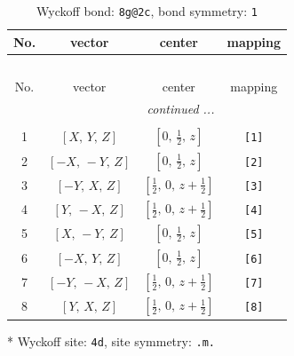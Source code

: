 \documentclass[fleqn,8pt]{jsarticle}
\begin{document}
\renewcommand{\arraystretch}{1.2}
\begin{longtable}{cccc}
\caption{Wyckoff bond: {\tt 8g@2c}, bond symmetry: {\tt 1}}
 \\
 \hline \hline
No. & vector & center & mapping \\ \hline \endfirsthead

\multicolumn{3}{l}{\tablename\ \thetable{}} \\
 \hline \hline
No. & vector & center & mapping \\ \hline \endhead

 \hline \hline
\multicolumn{3}{r}{\footnotesize\it continued ...} \\ \endfoot

 \hline \hline
\multicolumn{3}{r}{} \\ \endlastfoot

1 & $\left[ X,\, Y,\, Z \right]$ & $\left[ 0,\, \frac{1}{2},\, z \right]$ & {\tt [1]} \\ \hline
2 & $\left[ - X,\, - Y,\, Z \right]$ & $\left[ 0,\, \frac{1}{2},\, z \right]$ & {\tt [2]} \\ \hline
3 & $\left[ - Y,\, X,\, Z \right]$ & $\left[ \frac{1}{2},\, 0,\, z + \frac{1}{2} \right]$ & {\tt [3]} \\ \hline
4 & $\left[ Y,\, - X,\, Z \right]$ & $\left[ \frac{1}{2},\, 0,\, z + \frac{1}{2} \right]$ & {\tt [4]} \\ \hline
5 & $\left[ X,\, - Y,\, Z \right]$ & $\left[ 0,\, \frac{1}{2},\, z \right]$ & {\tt [5]} \\ \hline
6 & $\left[ - X,\, Y,\, Z \right]$ & $\left[ 0,\, \frac{1}{2},\, z \right]$ & {\tt [6]} \\ \hline
7 & $\left[ - Y,\, - X,\, Z \right]$ & $\left[ \frac{1}{2},\, 0,\, z + \frac{1}{2} \right]$ & {\tt [7]} \\ \hline
8 & $\left[ Y,\, X,\, Z \right]$ & $\left[ \frac{1}{2},\, 0,\, z + \frac{1}{2} \right]$ & {\tt [8]} \\
\end{longtable}
* Wyckoff site: {\tt 4d}, site symmetry: {\tt .m.}
\renewcommand{\arraystretch}{1.2}
\end{document}
